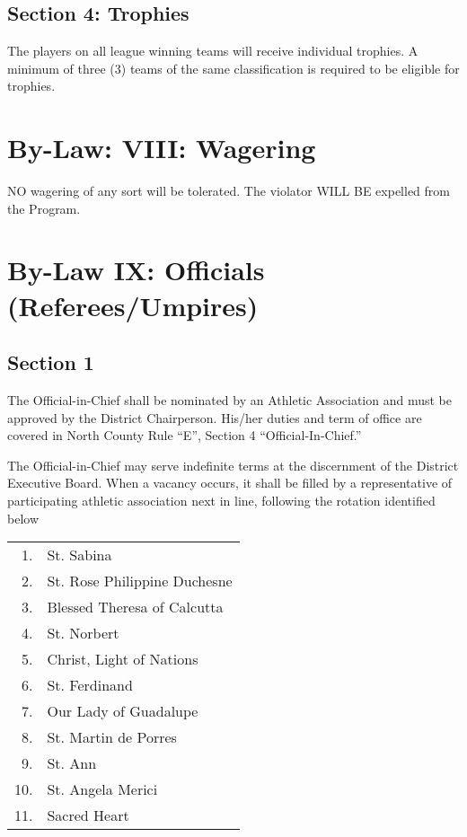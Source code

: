 \documentclass[letteraper,10pt,oneside,draft]{memoir}
\begin{document}
\subsection{Section 4: Trophies}
The players on all league winning teams will receive individual trophies.  A minimum of three (3) teams of the same classification is required to be eligible for trophies.

\section{By-Law: VIII: Wagering}
NO wagering of any sort will be tolerated. The violator WILL BE expelled from the Program.

\section{By-Law IX: Officials (Referees/Umpires)}
\subsection{Section 1}
The Official-in-Chief shall be nominated by an Athletic Association and must be approved by the District Chairperson.  His/her duties and term of office are covered in North County Rule ``E'', Section 4 ``Official-In-Chief.''

The Official-in-Chief may serve indefinite terms at the discernment of the District Executive Board. When a vacancy occurs, it shall be filled by a representative of participating athletic association next in line, following the rotation identified below

\begin{center}
    \begin{tabular}{ r l }
        1. & St. Sabina \\
        2. & St. Rose Philippine Duchesne \\
        3. & Blessed Theresa of Calcutta \\
        4. & St. Norbert \\
        5. & Christ, Light of Nations \\
        6. & St. Ferdinand \\
        7. & Our Lady of Guadalupe \\
        8. & St. Martin de Porres \\
        9. & St. Ann \\
        10. & St. Angela Merici \\
        11. & Sacred Heart \\
    \end{tabular}
\end{center}
\end{document}
